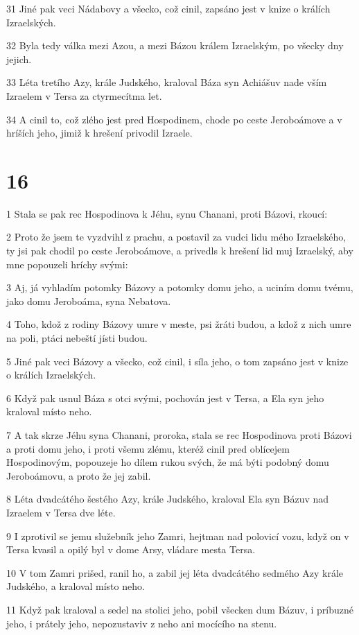 \par 31 Jiné pak veci Nádabovy a všecko, což cinil, zapsáno jest v knize o králích Izraelských.
\par 32 Byla tedy válka mezi Azou, a mezi Bázou králem Izraelským, po všecky dny jejich.
\par 33 Léta tretího Azy, krále Judského, kraloval Báza syn Achiášuv nade vším Izraelem v Tersa za ctyrmecítma let.
\par 34 A cinil to, což zlého jest pred Hospodinem, chode po ceste Jeroboámove a v hríších jeho, jimiž k hrešení privodil Izraele.

\chapter{16}

\par 1 Stala se pak rec Hospodinova k Jéhu, synu Chanani, proti Bázovi, rkoucí:
\par 2 Proto že jsem te vyzdvihl z prachu, a postavil za vudci lidu mého Izraelského, ty jsi pak chodil po ceste Jeroboámove, a privedls k hrešení lid muj Izraelský, aby mne popouzeli hríchy svými:
\par 3 Aj, já vyhladím potomky Bázovy a potomky domu jeho, a uciním domu tvému, jako domu Jeroboáma, syna Nebatova.
\par 4 Toho, kdož z rodiny Bázovy umre v meste, psi žráti budou, a kdož z nich umre na poli, ptáci nebeští jísti budou.
\par 5 Jiné pak veci Bázovy a všecko, což cinil, i síla jeho, o tom zapsáno jest v knize o králích Izraelských.
\par 6 Když pak usnul Báza s otci svými, pochován jest v Tersa, a Ela syn jeho kraloval místo neho.
\par 7 A tak skrze Jéhu syna Chanani, proroka, stala se rec Hospodinova proti Bázovi a proti domu jeho, i proti všemu zlému, kteréž cinil pred oblícejem Hospodinovým, popouzeje ho dílem rukou svých, že má býti podobný domu Jeroboámovu, a proto že jej zabil.
\par 8 Léta dvadcátého šestého Azy, krále Judského, kraloval Ela syn Bázuv nad Izraelem v Tersa dve léte.
\par 9 I zprotivil se jemu služebník jeho Zamri, hejtman nad polovicí vozu, když on v Tersa kvasil a opilý byl v dome Arsy, vládare mesta Tersa.
\par 10 V tom Zamri prišed, ranil ho, a zabil jej léta dvadcátého sedmého Azy krále Judského, a kraloval místo neho.
\par 11 Když pak kraloval a sedel na stolici jeho, pobil všecken dum Bázuv, i príbuzné jeho, i prátely jeho, nepozustaviv z neho ani mocícího na stenu.
